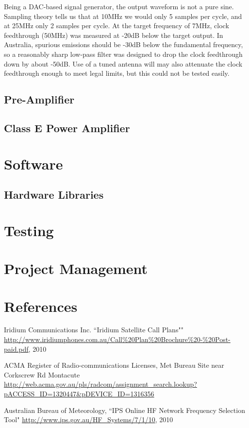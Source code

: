 \documentclass[a4paper,12pt]{article}
\begin{document}
Being a DAC-based signal generator, the output waveform is not a pure sine. Sampling theory tells us that at 10MHz we would only 5 samples per cycle, and at 25MHz only 2 samples per cycle. At the target frequency of 7MHz, clock feedthrough (50MHz) was measured at -20dB below the target output. In Australia, spurious emissions should be -30dB below the fundamental frequency, so a reasonably sharp low-pass filter was designed to drop the clock feedthrough down by about -50dB. Use of a tuned antenna will may also attenuate the clock feedthrough enough to meet legal limits, but this could not be tested easily.

\subsection{Pre-Amplifier}

\subsection{Class E Power Amplifier}


\section{Software}

\subsection{Hardware Libraries}

\section{Testing}

\section{Project Management}

\section{References}
\renewcommand*{\refname}{\vspace*{-12mm}}
\begin{thebibliography}{99}
Iridium Communications Inc. ``Iridium Satellite Call Plans"" \url{http://www.iridiumphones.com.au/Call\%20Plan\%20Brochure\%20-\%20Post-paid.pdf}, 2010

ACMA Register of Radio-communications Licenses, Met Bureau Site near Corkscrew Rd Montacute \url{http://web.acma.gov.au/pls/radcom/assignment\_search.lookup?pACCESS\_ID=1320447&pDEVICE\_ID=1316356}

Australian Bureau of Meteorology, ``IPS Online HF Network Frequency Selection Tool" \url{http://www.ips.gov.au/HF\_Systems/7/1/10}, 2010 %



\end{thebibliography}
\end{document}
